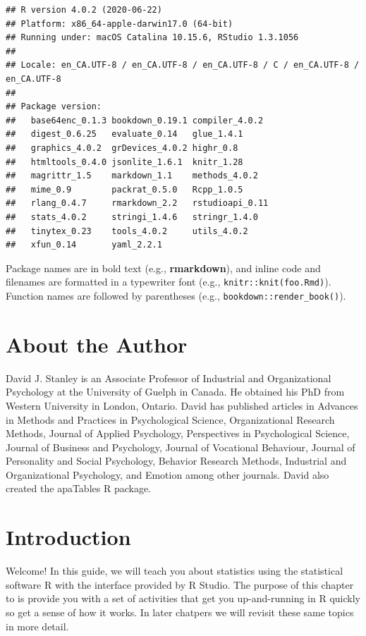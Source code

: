 \documentclass[
]{krantz}
\begin{document}
\begin{verbatim}
## R version 4.0.2 (2020-06-22)
## Platform: x86_64-apple-darwin17.0 (64-bit)
## Running under: macOS Catalina 10.15.6, RStudio 1.3.1056
## 
## Locale: en_CA.UTF-8 / en_CA.UTF-8 / en_CA.UTF-8 / C / en_CA.UTF-8 / en_CA.UTF-8
## 
## Package version:
##   base64enc_0.1.3 bookdown_0.19.1 compiler_4.0.2 
##   digest_0.6.25   evaluate_0.14   glue_1.4.1     
##   graphics_4.0.2  grDevices_4.0.2 highr_0.8      
##   htmltools_0.4.0 jsonlite_1.6.1  knitr_1.28     
##   magrittr_1.5    markdown_1.1    methods_4.0.2  
##   mime_0.9        packrat_0.5.0   Rcpp_1.0.5     
##   rlang_0.4.7     rmarkdown_2.2   rstudioapi_0.11
##   stats_4.0.2     stringi_1.4.6   stringr_1.4.0  
##   tinytex_0.23    tools_4.0.2     utils_4.0.2    
##   xfun_0.14       yaml_2.2.1
\end{verbatim}

Package names are in bold text (e.g., \textbf{rmarkdown}), and inline code and filenames are formatted in a typewriter font (e.g., \texttt{knitr::knit(\textquotesingle{}foo.Rmd\textquotesingle{})}). Function names are followed by parentheses (e.g., \texttt{bookdown::render\_book()}).

\hypertarget{about-the-author}{%
\chapter*{About the Author}\label{about-the-author}}


David J. Stanley is an Associate Professor of Industrial and Organizational Psychology at the University of Guelph in Canada. He obtained his PhD from Western University in London, Ontario. David has published articles in Advances in Methods and Practices in Psychological Science, Organizational Research Methods, Journal of Applied Psychology, Perspectives in Psychological Science, Journal of Business and Psychology, Journal of Vocational Behaviour, Journal of Personality and Social Psychology, Behavior Research Methods, Industrial and Organizational Psychology, and Emotion among other journals. David also created the apaTables R package.

\mainmatter

\hypertarget{introduction}{%
\chapter{Introduction}\label{introduction}}

Welcome! In this guide, we will teach you about statistics using the statistical software R with the interface provided by R Studio. The purpose of this chapter to is provide you with a set of activities that get you up-and-running in R quickly so get a sense of how it works. In later chatpers we will revisit these same topics in more detail.
\end{document}
